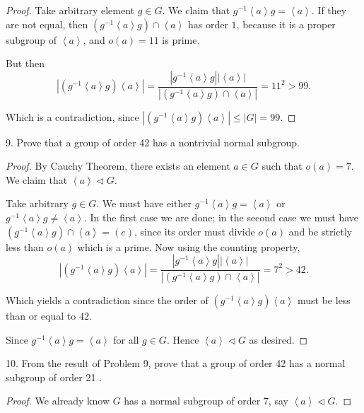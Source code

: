 \begin{enumerate}
\begin{proof}
	Take arbitrary element $g \in G$. We claim that $g^{-1}  \left\langle a \right\rangle g = \left\langle a \right\rangle $. If they are not equal, then $(g^{-1} \left\langle a \right\rangle g) \cap \left\langle a \right\rangle $ has order $1$, because it is a proper subgroup of $\left\langle a \right\rangle$, and $o(a) = 11$ is prime.

	But then
	\[
		\left| (g^{-1}  \left\langle a \right\rangle g) \left\langle a \right\rangle  \right| 
		= \frac{\left| g^{-1} \left\langle a \right\rangle g \right| \left| \left\langle a \right\rangle  \right| }{\left| (g^{-1} \left\langle a \right\rangle g) \cap \left\langle a \right\rangle  \right| }
		= 11^2 > 99
	.\] 

	Which is a contradiction, since $ \left| (g^{-1}  \left\langle a \right\rangle g) \left\langle a \right\rangle \right|  \le |G| = 99$.
\end{proof}

9. Prove that a group of order 42 has a nontrivial normal subgroup.
\begin{proof}
	By Cauchy Theorem, there exists an element $a \in G$ such that $o(a) = 7$. We claim that $\left\langle a \right\rangle \triangleleft G$.

	Take arbitrary $g \in G$. We must have either $g^{-1} \left\langle a \right\rangle g = \left\langle a \right\rangle $ or $g^{-1} \left\langle a \right\rangle g \neq  \left\langle a \right\rangle $.
	In the first case we are done; in the second case we must have $(g^{-1} \left\langle a \right\rangle g) \cap \left\langle a \right\rangle = (e)$, since its order must divide $o(a)$ and be strictly less than $o(a)$ which is a prime.
	Now using the counting property,
	\[
		\left| (g^{-1}  \left\langle a \right\rangle g) \left\langle a \right\rangle  \right| 
		= \frac{\left| g^{-1} \left\langle a \right\rangle g \right| \left| \left\langle a \right\rangle  \right| }{\left| (g^{-1} \left\langle a \right\rangle g) \cap \left\langle a \right\rangle \right|  }
		= 7^2 > 42
	.\]
		
	Which yields a contradiction since the order of $(g^{-1}  \left\langle a \right\rangle g) \left\langle a \right\rangle $ must be less than or equal to $42$.

	Since $g^{-1} \left\langle a \right\rangle g = \left\langle a \right\rangle $ for all $g \in G$. Hence $\left\langle a \right\rangle \triangleleft G$ as desired.
\end{proof}

10. From the result of Problem 9, prove that a group of order 42 has a normal subgroup of order 21 .
\begin{proof}
	We already know $G$ has a normal subgroup of order $7$, say $\left\langle a \right\rangle \triangleleft G$.


\end{proof}
\end{enumerate}
